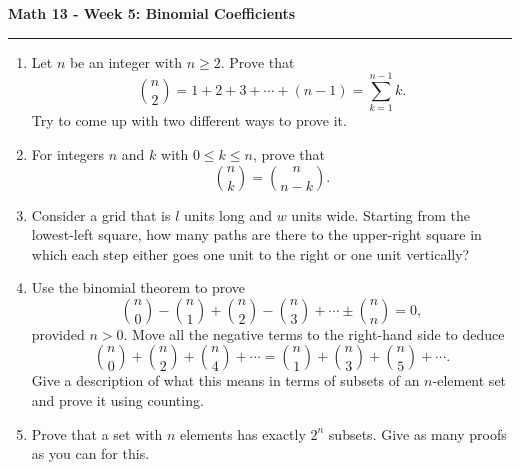 \documentclass[12pt]{report}
\theoremstyle{definition}
\begin{document}
\begin{center}
{\bf \Large Math 13 - Week 5: Binomial Coefficients}
\vspace{0.2cm}
\hrule
\end{center}

\begin{enumerate}	

\item Let $n$ be an integer with $n\geq 2$. Prove that
\[
	\binom{n}{2} = 1+2+3 + \cdots  + (n-1) = \sum_{k=1}^{n-1}k.
\]
Try to come up with two different ways to prove it.
\vfill

\item For integers $n$ and $k$ with $0\leq k\leq n$, prove that
\[
\binom{n}{k} = \binom{n}{n-k}.
\]

\vfill

\item Consider a grid that is $l$ units long and $w$ units wide.
Starting from the lowest-left square, how many paths are there to the upper-right square in which each step either goes one unit to the right or one unit vertically?
\vfill

\item Use the binomial theorem to prove
\[
\binom{n}{0} - \binom{n}{1} + \binom{n}{2} -\binom{n}{3} + \cdots \pm \binom{n}{n} = 0,
\]
provided $n>0$. Move all the negative terms to the right-hand side to deduce
\[
	\binom{n}{0}+\binom{n}{2} + \binom{n}{4} + \cdots = \binom{n}{1}+\binom{n}{3} + \binom{n}{5}+\cdots.
\]
Give a description of what this means in terms of subsets of an $n$-element set and prove it using counting.

\vfill

\item Prove that a set with $n$ elements has exactly $2^n$ subsets. Give as many proofs as you can for this.
\vfill

\end{enumerate}
\end{document}
